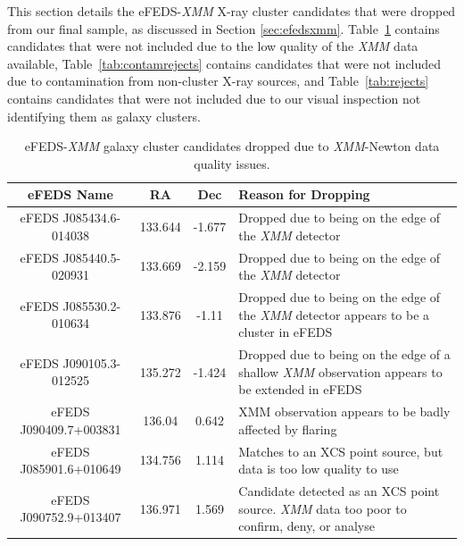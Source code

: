 \documentclass[fleqn,usenatbib]{mnras}
\begin{document}
This section details the eFEDS-{\em XMM} X-ray cluster candidates that were dropped from our final sample, as discussed in Section \ref{sec:efedsxmm}. Table~\ref{tab:xmmrejects} contains candidates that were not included due to the low quality of the {\em XMM} data available, Table~\ref{tab:contamrejects} contains candidates that were not included due to contamination from non-cluster X-ray sources, and Table~\ref{tab:rejects} contains candidates that were not included due to our visual inspection not identifying them as galaxy clusters.

\begin{table}
\begin{center}
\caption[]{{eFEDS-{\em XMM} galaxy cluster candidates dropped due to {\em XMM}-Newton data quality issues.}\label{tab:xmmrejects}}
\vspace{1mm}
\begin{tabular}{ccc|l}
\hline
\hline
eFEDS Name & RA & Dec & Reason for Dropping\\
\hline
\hline
eFEDS J085434.6-014038 & 133.644 & -1.677 & Dropped due to being on the edge of the {\em XMM} detector \\ 
\hline 
eFEDS J085440.5-020931 & 133.669 & -2.159 & Dropped due to being on the edge of the {\em XMM} detector \\ 
\hline
eFEDS J085530.2-010634 & 133.876 & -1.11 & Dropped due to being on the edge of the {\em XMM} detector appears to be a cluster in eFEDS \\ 
\hline 
eFEDS J090105.3-012525 & 135.272 & -1.424 & Dropped due to being on the edge of a shallow {\em XMM} observation appears to be extended in eFEDS \\ 
\hline 
eFEDS J090409.7+003831 & 136.04 & 0.642 & XMM observation appears to be badly affected by flaring \\ 
\hline
eFEDS J085901.6+010649 & 134.756 & 1.114 & Matches to an XCS point source, but data is too low quality to use \\
\hline
eFEDS J090752.9+013407 & 136.971 & 1.569 & Candidate detected as an XCS point source. {\em XMM} data too poor to confirm, deny, or analyse\\ 
\hline 
\end{tabular}
\end{center}
\end{table}
\end{document}
